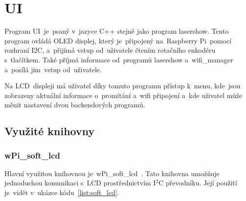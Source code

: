 \section{UI}
Program UI~je~psaný v~jazyce C++ stejně jako program lasershow. Tento program ovládá OLED displej, který je~připojený na~Raspberry Pi~pomocí rozhraní I2C, a~přijímá vstup od~uživatele čtením rotačního enkodéru s~tlačítkem. Také příjmá informace od~programů lasershow a~wifi\_manager a~posílá jim~vstup od~uživatele.

Na LCD~displeji má uživatel díky tomuto programu přístup k~menu, kde~jsou zobrazeny aktuální informace o~promítání a~wifi připojení a~kde uživatel může měnit nastavení dvou backendových programů.


\subsection{Využité knihovny}
\subsubsection{wPi\_soft\_lcd}
Hlavní využitou knihovnou je~wPi\_soft\_lcd~\cite{wpi-lcd}. Tato knihovna umožňuje jednoduchou komunikaci s~LCD prostřednictvím I$^{2}$C převodníku. Její použití je~vidět v~ukázce kódu~\ref{list:soft_lcd}.

\begin{code}
    \inputminted[frame=lines,fontsize=\footnotesize{}, linenos, breaklines]{cpp}{code_examples/soft_lcd.cpp}
\end{code}

